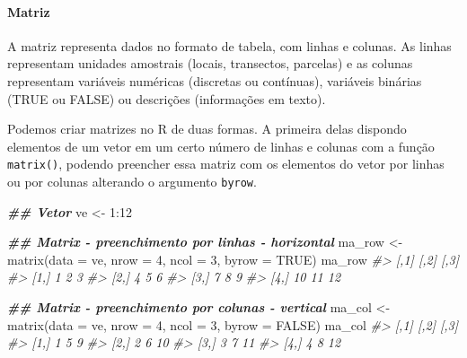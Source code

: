 \documentclass[
]{book}
\newenvironment{Shaded}{\begin{snugshade}}{\end{snugshade}}
\newcommand{\AttributeTok}[1]{\textcolor[rgb]{0.61,0.61,0.61}{#1}}
\newcommand{\CommentTok}[1]{\textcolor[rgb]{0.37,0.37,0.37}{\textit{#1}}}
\newcommand{\ConstantTok}[1]{\textcolor[rgb]{0,0,0}{#1}}
\newcommand{\DecValTok}[1]{\textcolor[rgb]{0.06,0.06,0.06}{#1}}
\newcommand{\DocumentationTok}[1]{\textcolor[rgb]{0.37,0.37,0.37}{\textbf{\textit{#1}}}}
\newcommand{\FunctionTok}[1]{\textcolor[rgb]{0,0,0}{#1}}
\newcommand{\NormalTok}[1]{#1}
\newcommand{\OtherTok}[1]{\textcolor[rgb]{0.37,0.37,0.37}{#1}}
\newcommand{\SpecialCharTok}[1]{\textcolor[rgb]{0,0,0}{#1}}
\begin{document}
\hypertarget{matriz}{%
\paragraph{Matriz}\label{matriz}}

A matriz representa dados no formato de tabela, com linhas e colunas. As linhas representam unidades amostrais (locais, transectos, parcelas) e as colunas representam variáveis numéricas (discretas ou contínuas), variáveis binárias (TRUE ou FALSE) ou descrições (informações em texto).

Podemos criar matrizes no R de duas formas. A primeira delas dispondo elementos de um vetor em um certo número de linhas e colunas com a função \texttt{matrix()}, podendo preencher essa matriz com os elementos do vetor por linhas ou por colunas alterando o argumento \texttt{byrow}.

\begin{Shaded}
\begin{Highlighting}[]
\DocumentationTok{\#\# Vetor}
\NormalTok{ve }\OtherTok{\textless{}{-}} \DecValTok{1}\SpecialCharTok{:}\DecValTok{12}

\DocumentationTok{\#\# Matrix {-} preenchimento por linhas {-} horizontal}
\NormalTok{ma\_row }\OtherTok{\textless{}{-}} \FunctionTok{matrix}\NormalTok{(}\AttributeTok{data =}\NormalTok{ ve, }\AttributeTok{nrow =} \DecValTok{4}\NormalTok{, }\AttributeTok{ncol =} \DecValTok{3}\NormalTok{, }\AttributeTok{byrow =} \ConstantTok{TRUE}\NormalTok{)}
\NormalTok{ma\_row}
\CommentTok{\#\textgreater{}      [,1] [,2] [,3]}
\CommentTok{\#\textgreater{} [1,]    1    2    3}
\CommentTok{\#\textgreater{} [2,]    4    5    6}
\CommentTok{\#\textgreater{} [3,]    7    8    9}
\CommentTok{\#\textgreater{} [4,]   10   11   12}

\DocumentationTok{\#\# Matrix {-} preenchimento por colunas {-} vertical}
\NormalTok{ma\_col }\OtherTok{\textless{}{-}} \FunctionTok{matrix}\NormalTok{(}\AttributeTok{data =}\NormalTok{ ve, }\AttributeTok{nrow =} \DecValTok{4}\NormalTok{, }\AttributeTok{ncol =} \DecValTok{3}\NormalTok{, }\AttributeTok{byrow =} \ConstantTok{FALSE}\NormalTok{)}
\NormalTok{ma\_col}
\CommentTok{\#\textgreater{}      [,1] [,2] [,3]}
\CommentTok{\#\textgreater{} [1,]    1    5    9}
\CommentTok{\#\textgreater{} [2,]    2    6   10}
\CommentTok{\#\textgreater{} [3,]    3    7   11}
\CommentTok{\#\textgreater{} [4,]    4    8   12}
\end{Highlighting}
\end{Shaded}
\end{document}
